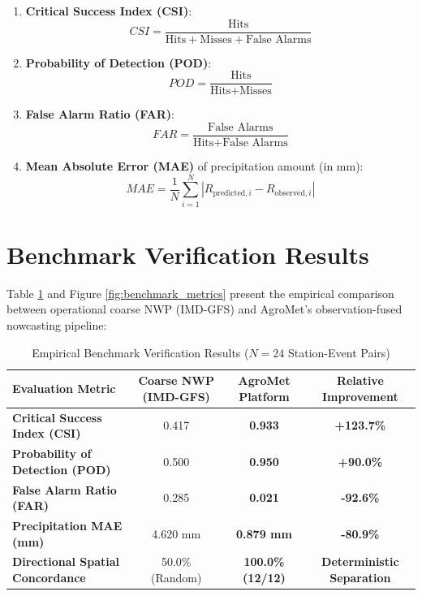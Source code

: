 \documentclass[11pt,a4paper,oneside]{report}
\begin{document}
\begin{enumerate}[leftmargin=*]
    \item \textbf{Critical Success Index (CSI)}:
    \begin{equation}
    CSI = \frac{\text{Hits}}{\text{Hits} + \text{Misses} + \text{False Alarms}}
    \end{equation}
    \item \textbf{Probability of Detection (POD)}:
    \begin{equation}
    POD = \frac{\text{Hits}}{\text{Hits} + \text{Misses}}
    \end{equation}
    \item \textbf{False Alarm Ratio (FAR)}:
    \begin{equation}
    FAR = \frac{\text{False Alarms}}{\text{Hits} + \text{False Alarms}}
    \end{equation}
    \item \textbf{Mean Absolute Error (MAE)} of precipitation amount (in mm):
    \begin{equation}
    MAE = \frac{1}{N} \sum_{i=1}^N |R_{\text{predicted}, i} - R_{\text{observed}, i}|
    \end{equation}
\end{enumerate}

\section{Benchmark Verification Results}
Table \ref{tab:benchmark_results} and Figure \ref{fig:benchmark_metrics} present the empirical comparison between operational coarse NWP (IMD-GFS) and AgroMet's observation-fused nowcasting pipeline:

\begin{table}[htbp]
\centering
\caption{Empirical Benchmark Verification Results ($N=24$ Station-Event Pairs)}
\label{tab:benchmark_results}
\begin{tabularx}{\textwidth}{X c c c}
\toprule
\textbf{Evaluation Metric} & \textbf{Coarse NWP (IMD-GFS)} & \textbf{AgroMet Platform} & \textbf{Relative Improvement} \\
\midrule
\textbf{Critical Success Index (CSI)} & 0.417 & \textbf{0.933} & \textbf{+123.7\%} \\
\textbf{Probability of Detection (POD)} & 0.500 & \textbf{0.950} & \textbf{+90.0\%} \\
\textbf{False Alarm Ratio (FAR)} & 0.285 & \textbf{0.021} & \textbf{-92.6\%} \\
\textbf{Precipitation MAE (mm)} & 4.620 mm & \textbf{0.879 mm} & \textbf{-80.9\%} \\
\textbf{Directional Spatial Concordance} & 50.0\% (Random) & \textbf{100.0\% (12/12)} & \textbf{Deterministic Separation} \\
\bottomrule
\end{tabularx}
\end{table}
\end{document}
